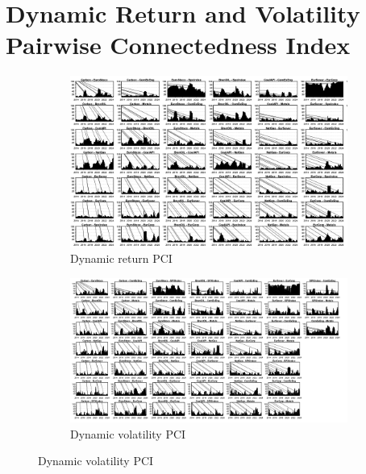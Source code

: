 \documentclass[preprint, 3p,
authoryear]{elsarticle} %
\begin{document}
\section{Dynamic Return and Volatility Pairwise Connectedness Index}
\label{appendix:c}
\begin{figure}[H]
  \caption{Dynamic Return and Volatility Pairwise Connectedness Index (Jan 2013 – Aug 2024)}
  \label{fig:dynPCIfull}
      \begin{subfigure}[H]{\textwidth}
        \centering
        \caption{Dynamic return PCI}
        \label{fig:dynretPCIfull}
        \includegraphics[width = \textwidth]{7a-AppCa-DynRetPCIfull}
      \end{subfigure}
    \bigskip
      \begin{subfigure}[H]{\textwidth}
        \centering
        \caption{Dynamic volatility PCI}
        \label{fig:dynvolPCIfull}
        \includegraphics[width = \textwidth]{7b-AppCa-DynVolPCIfull}
      \end{subfigure}
\end{figure}

\renewcommand\refname{References}

\end{document}
